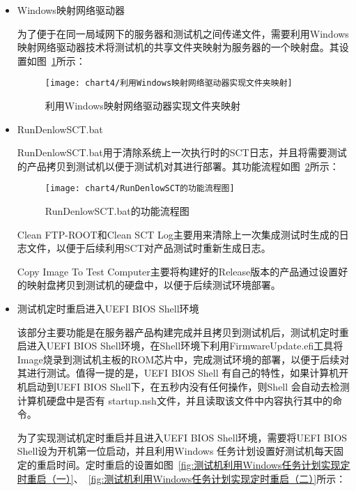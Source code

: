 		\begin{itemize}
			\item Windows映射网络驱动器
				
				为了便于在同一局域网下的服务器和测试机之间传递文件，需要利用Windows映射网络驱动器技术将测试机的共享文件夹映射为服务器的一个映射盘。其设置如图~\ref{fig:利用Windows映射网络驱动器实现文件夹映射}所示：
			
				\begin{figure}[H] %
					\centering
					\texttt{[image: chart4/利用Windows映射网络驱动器实现文件夹映射]}
					\caption{利用Windows映射网络驱动器实现文件夹映射}
					\label{fig:利用Windows映射网络驱动器实现文件夹映射}
				\end{figure}
			
			\item RunDenlowSCT.bat
				
				RunDenlowSCT.bat用于清除系统上一次执行时的SCT日志，并且将需要测试的产品拷贝到测试机以便于测试机对其进行部署。其功能流程如图~\ref{fig:RunDenlowSCT的功能流程图}所示：
				
				\begin{figure}[H] %
					\centering
					\texttt{[image: chart4/RunDenlowSCT的功能流程图]}
					\caption{RunDenlowSCT.bat的功能流程图}
					\label{fig:RunDenlowSCT的功能流程图}
				\end{figure}
				
				Clean FTP-ROOT和Clean SCT Log主要用来清除上一次集成测试时生成的日志文件，以便于后续利用SCT对产品测试时重新生成日志。
				
				Copy Image To Test Computer主要将构建好的Release版本的产品通过设置好的映射盘拷贝到测试机的硬盘中，以便于后续测试环境部署。
			\item 测试机定时重启进入UEFI BIOS Shell环境
				
				该部分主要功能是在服务器产品构建完成并且拷贝到测试机后，测试机定时重启进入UEFI BIOS Shell环境，在Shell环境下利用FirmwareUpdate.efi工具将Image烧录到测试机主板的ROM芯片中，完成测试环境的部署，以便于后续对其进行测试。值得一提的是，UEFI BIOS Shell 有自己的特性，如果计算机开机启动到UEFI BIOS Shell下，在五秒内没有任何操作，则Shell 会自动去检测计算机硬盘中是否有 startup.nsh文件，并且读取该文件中内容执行其中的命令。
				
				为了实现测试机定时重启并且进入UEFI BIOS Shell环境，需要将UEFI BIOS Shell设为开机第一位启动，并且利用Windows 任务计划设置好测试机每天固定的重启时间。定时重启的设置如图~\ref{fig:测试机利用Windows任务计划实现定时重启（一）}、~\ref{fig:测试机利用Windows任务计划实现定时重启（二）}所示：
				

\end{itemize}
